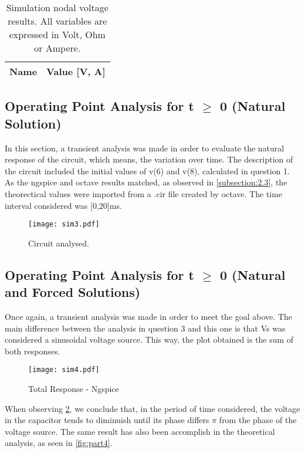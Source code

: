 \begin{table}[ht]
  \centering
  \begin{tabular}{|l|r|}
    \hline    
    {\bf Name} & {\bf Value [V, A]} \\ \hline
    
  \end{tabular}
  \caption{Simulation nodal voltage results. All variables are expressed in Volt, Ohm or Ampere.} 
\end{table}



\subsection{Operating Point Analysis for t $\ge$ 0 (Natural Solution)}


In this section, a transient analysis was made in order to evaluate the natural response of the circuit, which means, the variation over time. The description of the circuit included the initial values of v(6) and v(8), calculated in question 1. As the ngspice and octave results matched, as observed in \ref{subsection:2.3}, the theorectical values were imported from a .cir file created by octave.
The time interval considered was [0,20]ms.

\begin{figure}[h] \centering
\texttt{[image: sim3.pdf]}
\caption{Circuit analysed.}
\label{fig:sim3}
\end{figure}
\newpage

\clearpage

\subsection{Operating Point Analysis for t $\ge$ 0 (Natural and Forced Solutions)}

Once again, a transient analysis was made in order to meet the goal above. The main difference between the analysis in question 3 and this one is that Vs was considered a sinusoidal voltage source. This way, the plot obtained is the sum of both responses.

\begin{figure}[h] \centering
\texttt{[image: sim4.pdf]}
\caption{Total Response - Ngspice}
\label{fig:sim4}
\end{figure}

 When observing \ref{fig:sim4}, we conclude that, in the period of time considered, the voltage in the capacitor tends to diminuish until its phase differs $\pi$ from the phase of the voltage source. The same result has also been accomplish in the theoretical analysis, as seen in \ref{fig:part4}.



